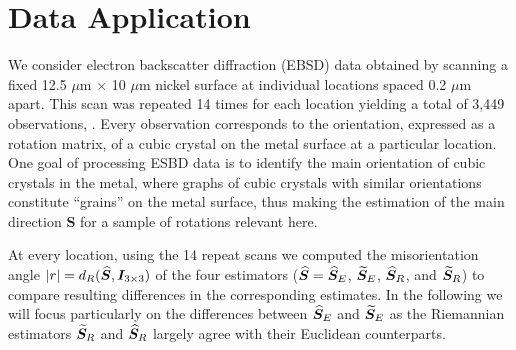 \section{Data Application}\label{sec:data}

We consider electron backscatter diffraction (EBSD) data obtained by scanning a fixed  12.5 $\mu$m $\times$ 10 $\mu$m nickel surface at individual locations spaced 0.2 $\mu$m apart. This scan was repeated 14 times for each location yielding a total of 3,449 observations, \citep{bingham09, bingham10b}. Every observation corresponds to the orientation, expressed as a rotation matrix, of a cubic crystal on the metal surface at a particular location. One goal of processing ESBD data is to identify the main orientation of cubic crystals in the metal, where graphs of cubic crystals with similar orientations constitute ``grains'' on the metal surface, thus making the estimation of the main direction $\bm S$ for a sample of rotations relevant here.

At every location, using the 14 repeat scans  we computed the misorientation angle $|r|={d_R}(\widehat{\bm{S}}, \bm I_{3\times 3})$ of the four estimators ($\widehat{\bm{S}}= {\widehat{\bm S}_E}$, ${\widetilde{\bm S}_E}$, ${\widehat{\bm S}_R}$, and ${\widetilde{\bm S}_R}$) to compare resulting differences in the corresponding estimates.  In the following we will focus particularly on the differences between ${\widehat{\bm S}_E}$ and ${\widetilde{\bm S}_E}$ as the Riemannian estimators  ${\widetilde{\bm S}_R}$ and ${\widehat{\bm S}_R}$ largely agree with their Euclidean counterparts. 

